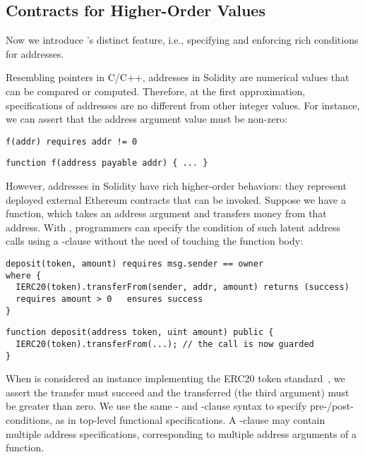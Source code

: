 \subsection{Contracts for Higher-Order Values}\label{sec:examples-higher-order}

Now we introduce \lang's distinct feature, i.e., specifying and enforcing
rich conditions for addresses.

Resembling pointers in C/C++, addresses in Solidity are numerical values
that can be compared or computed.
Therefore, at the first approximation, specifications of addresses are 
no different from other integer values.
For instance, we can assert that the address argument value must be non-zero:
\begin{lstlisting}[language=Consol]
f(addr) requires addr != 0
\end{lstlisting}
\vspace{-0.25em}
\begin{lstlisting}
function f(address payable addr) { ... }
\end{lstlisting}

However, addresses in Solidity have rich higher-order behaviors: they
represent deployed external Ethereum contracts that can be invoked.
Suppose we have a  function,
which takes an address argument and transfers money from that address. %
With \lang, programmers can specify the condition of such latent address
calls using a -clause without the need of touching the function body:
\begin{lstlisting}[language=Consol]
deposit(token, amount) requires msg.sender == owner
where {
  IERC20(token).transferFrom(sender, addr, amount) returns (success)
  requires amount > 0   ensures success
}
\end{lstlisting}
\vspace{-0.25em}
\begin{lstlisting}
function deposit(address token, uint amount) public {
  IERC20(token).transferFrom(...); // the call is now guarded
}
\end{lstlisting}
When  is considered an instance implementing the ERC20 token standard~\cite{vogelstellerEIP20TokenStandard2023},
we assert the transfer must succeed and the transferred  (the third argument) must be greater than zero.
We use the same - and -clause syntax to specify pre-/post-conditions,
as in top-level functional specifications.
A -clause may contain multiple address specifications, corresponding
to multiple address arguments of a function.

